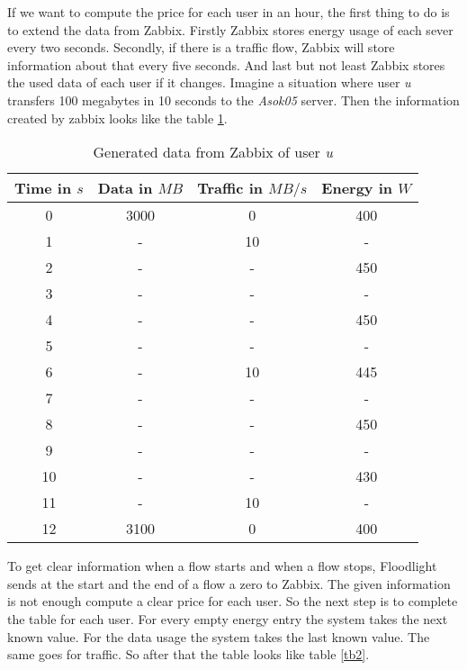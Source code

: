  If we want to compute the price for each user in an hour, the first thing to do is to extend the data from Zabbix. Firstly Zabbix stores energy usage of each sever every two seconds. Secondly, if there is a traffic flow, Zabbix will store information about that every five seconds. And last but not least Zabbix stores the used data of each user if it changes. Imagine a situation where user \textit{u} transfers 100 megabytes in 10 seconds to the \textit{Asok05} server. Then the information created by zabbix looks like the table \ref{tb1}. 
\begin{table}
\centering
\caption{Generated data from Zabbix of user \textit{u}}
\begin{tabular}{|c|c|c|c|}
 \hline Time in $s$ & Data in $MB$ & Traffic in $MB/s$ & Energy in $W$ \\ 
  \hline 0 & 3000 & 0 & 400 \\ 
 \hline 1 & - & 10 & - \\ 
 \hline 2 & - & - & 450 \\ 
 \hline 3 & - & - & -\\ 
 \hline 4 & - & - & 450 \\ 
 \hline 5 & - & - & - \\
 \hline 6 & - & 10 & 445 \\ 
 \hline 7 & - & - & -\\ 
 \hline 8 & - & - & 450 \\ 
 \hline 9 & - & - & - \\  
 \hline 10 & - & - & 430 \\
  \hline 11 & - & 10 & - \\
 \hline 12 & 3100 & 0 & 400 \\  
 \hline 
 \end{tabular}
 \label{tb1} 
 \end{table}
 
 To get clear information when a flow starts and when a flow stops, Floodlight sends at the start and the end of a flow a zero to Zabbix. The given information is not enough compute a clear price for each user. So the next step is to complete the table for each user. For every empty energy entry the system takes the next known value. For the data usage the system takes the last known value. The same goes for traffic. So after that the table looks like table \ref{tb2}.
 

